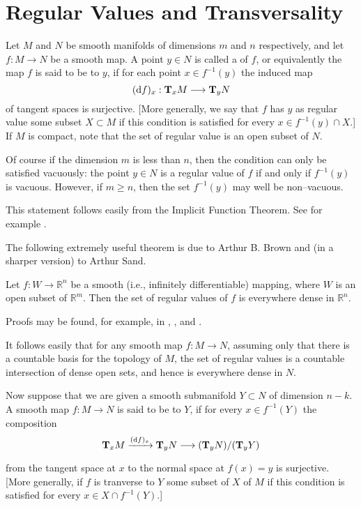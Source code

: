 \documentclass[../main]{subfiles}
\begin{document}
\section{Regular Values and Transversality}
Let $M$ and $N$ be smooth manifolds of dimensions $m$ and $n$ respectively, and let $f : M \longrightarrow N$ be a smooth map. A point $y \in N$ is called a  of $f$, or equivalently the map $f$ is said to be  to $y$, if for each point $x \in f^{-1}(y)$ the induced map \[(\dd f)_x : \tangentspace M x \longrightarrow \tangentspace N y\] of tangent spaces is surjective. [More generally, we say that $f$ has $y$ as regular value  some subset $X \subset M$ if this condition is satisfied for every $x \in f^{-1}(y) \cap X$.] If $M$ is compact, note that the set of regular value is an open subset of $N$. 

Of course if the dimension $m$ is less than $n$, then the condition can only be satisfied vacuously: the point $y \in N$ is a regular value of $f$ if and only if $f^{-1}(y)$ is vacuous. However, if $m \ge n$, then the set $f^{-1}(y)$ may well be non--vacuous. 

 This statement follows easily from the Implicit Function Theorem. See for example \cite[p. 138]{graves}. 

The following extremely useful theorem is due to Arthur B. Brown and (in a sharper version) to Arthur Sand. %
\begin{theorem*}[Brown]\label{brown}
Let $f : W \longrightarrow {\mathbb R}^n$ be a smooth (i.e., infinitely differentiable) mapping, where $W$ is an open subset of ${\mathbb R}^m$. Then the set of regular values of $f$ is everywhere dense in ${\mathbb R}^n$. 
\end{theorem*}

Proofs may be found, for example, in \cite{brown}, \cite{sard},\cite{sternberg1999lectures} and \cite{milnor1965}.

It follows easily that for any smooth map $f : M \longrightarrow N$, assuming only that there is a countable basis for the topology of $M$, the set of regular values is a countable intersection of dense open sets, and hence is everywhere dense in $N$. 

Now suppose that we are given a smooth submanifold $Y \subset N$ of dimension $n - k$. A smooth map $f : M \longrightarrow N$ is said to be  to $Y$, if for every $x \in f^{-1}(Y)$ the composition \[\tangentspace M x \varrightarrow{(\dd f)_x} \tangentspace N y \varrightarrow{} (\tangentspace N y)/(\tangentspace Y y)\] from the tangent space at $x$ to the normal space at $f(x) = y$ is surjective. [More generally, if $f$ is tranverse to $Y$  some subset of $X$ of $M$ if this condition is satisfied for every $x \in X \cap f^{-1}(Y)$.]
\end{document}
